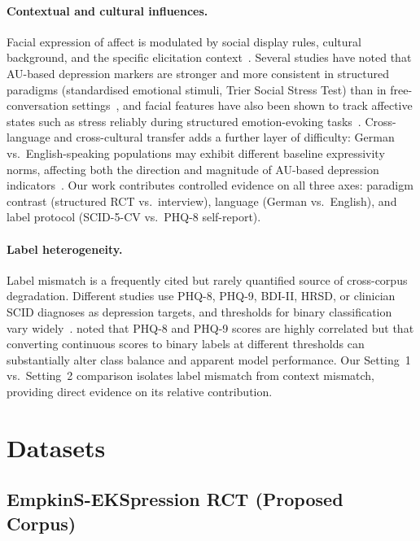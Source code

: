 \documentclass[sigconf]{acmart}
\begin{document}
\paragraph{Contextual and cultural influences.}
Facial expression of affect is modulated by social display rules, cultural
background, and the specific elicitation context~\cite{matsumoto2008cultural,
alghowinem2016multimodal}. Several studies have noted that AU-based depression
markers are stronger and more consistent in structured paradigms
(standardised emotional stimuli, Trier Social Stress Test) than in
free-conversation settings~\cite{alghowinem2016multimodal,girard2014},
and facial features have also been shown to track affective states such as
stress reliably during structured emotion-evoking
tasks~\cite{rupp2025stress}.
Cross-language and cross-cultural transfer adds a further layer of difficulty:
German vs.\ English-speaking populations may exhibit different baseline
expressivity norms, affecting both the direction and magnitude of AU-based
depression indicators~\cite{matsumoto2008cultural}.
Our work contributes controlled evidence on all three axes: paradigm contrast
(structured RCT vs.\ interview), language (German vs.\ English), and
label protocol (SCID-5-CV vs.\ PHQ-8 self-report).

\paragraph{Label heterogeneity.}
Label mismatch is a frequently cited but rarely quantified source of cross-corpus
degradation. Different studies use PHQ-8, PHQ-9, BDI-II, HRSD, or clinician SCID
diagnoses as depression targets, and thresholds for binary classification vary
widely~\cite{cummins2015review}. \citet{ringeval2019avec} noted that PHQ-8 and
PHQ-9 scores are highly correlated but that converting continuous scores to
binary labels at different thresholds can substantially alter class balance and
apparent model performance. Our Setting~1 vs.\ Setting~2 comparison isolates
label mismatch from context mismatch, providing direct evidence on its
relative contribution.


\section{Datasets}
\label{sec:data}

\subsection{EmpkinS-EKSpression RCT (Proposed Corpus)}
\label{sec:empkins}
\end{document}

